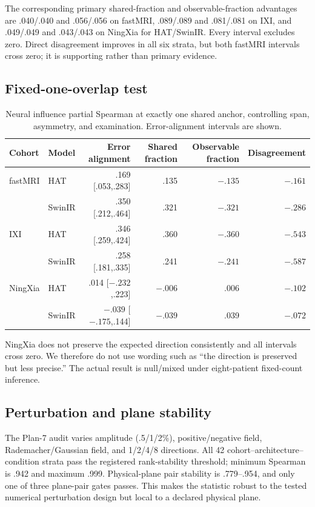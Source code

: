 \documentclass[10pt,twocolumn,letterpaper]{article}
\begin{document}
The corresponding primary shared-fraction and observable-fraction advantages are .040/.040 and .056/.056 on fastMRI, .089/.089 and .081/.081 on IXI, and .049/.049 and .043/.043 on NingXia for HAT/SwinIR. Every interval excludes zero. Direct disagreement improves in all six strata, but both fastMRI intervals cross zero; it is supporting rather than primary evidence.

\subsection{Fixed-one-overlap test}
\begin{table}[t]
\centering
\caption{Neural influence partial Spearman at exactly one shared anchor, controlling span, asymmetry, and examination. Error-alignment intervals are shown.}
\label{tab:fixed}
\setlength{\tabcolsep}{4pt}
\begin{tabular}{llrrrr}
\toprule
Cohort & Model & Error alignment & Shared fraction & Observable fraction & Disagreement \\
\midrule
fastMRI & HAT & .169 [.053,.283] & .135 & $-.135$ & $-.161$ \\
 & SwinIR & .350 [.212,.464] & .321 & $-.321$ & $-.286$ \\
IXI & HAT & .346 [.259,.424] & .360 & $-.360$ & $-.543$ \\
 & SwinIR & .258 [.181,.335] & .241 & $-.241$ & $-.587$ \\
NingXia & HAT & .014 [$-.232$,.223] & $-.006$ & .006 & $-.102$ \\
 & SwinIR & $-.039$ [$-.175$,.144] & $-.039$ & .039 & $-.072$ \\
\bottomrule
\end{tabular}
\end{table}

NingXia does not preserve the expected direction consistently and all intervals cross zero. We therefore do not use wording such as “the direction is preserved but less precise.” The actual result is null/mixed under eight-patient fixed-count inference.

\subsection{Perturbation and plane stability}
The Plan-7 audit varies amplitude (.5/1/2\%), positive/negative field, Rademacher/Gaussian field, and 1/2/4/8 directions. All 42 cohort--architecture--condition strata pass the registered rank-stability threshold; minimum Spearman is .942 and maximum .999. Physical-plane pair stability is .779--.954, and only one of three plane-pair gates passes. This makes the statistic robust to the tested numerical perturbation design but local to a declared physical plane.
\end{document}
